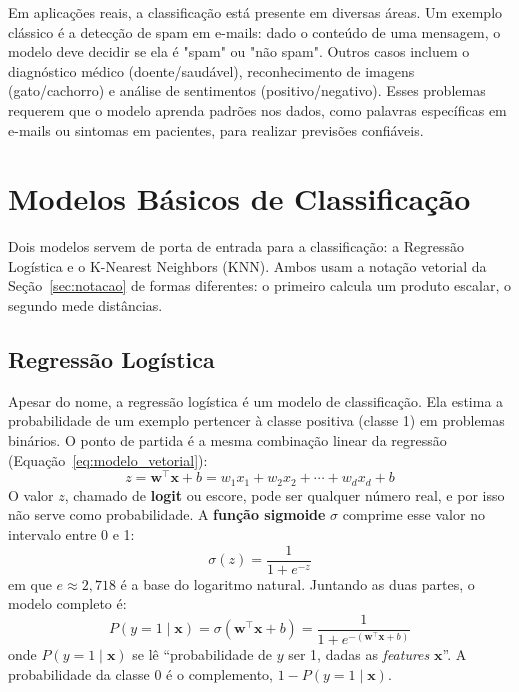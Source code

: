 \documentclass[a4paper,12pt,openany]{book}
\begin{document}
Em aplicações reais, a classificação está presente em diversas áreas. Um exemplo clássico é a detecção de spam em e-mails: dado o conteúdo de uma mensagem, o modelo deve decidir se ela é "spam" ou "não spam". Outros casos incluem o diagnóstico médico (doente/saudável), reconhecimento de imagens (gato/cachorro) e análise de sentimentos (positivo/negativo). Esses problemas requerem que o modelo aprenda padrões nos dados, como palavras específicas em e-mails ou sintomas em pacientes, para realizar previsões confiáveis.

\section{Modelos Básicos de Classificação}

Dois modelos servem de porta de entrada para a classificação: a Regressão Logística e o K-Nearest Neighbors (KNN). Ambos usam a notação vetorial da Seção~\ref{sec:notacao} de formas diferentes: o primeiro calcula um produto escalar, o segundo mede distâncias.

\subsection{Regressão Logística}

Apesar do nome, a regressão logística é um modelo de classificação. Ela estima a probabilidade de um exemplo pertencer à classe positiva (classe 1) em problemas binários. O ponto de partida é a mesma combinação linear da regressão (Equação~\ref{eq:modelo_vetorial}):
\begin{equation}
z = \mathbf{w}^\top \mathbf{x} + b = w_1 x_1 + w_2 x_2 + \cdots + w_d x_d + b
\end{equation}
O valor \(z\), chamado de \textbf{logit} ou escore, pode ser qualquer número real, e por isso não serve como probabilidade. A \textbf{função sigmoide} \(\sigma\) comprime esse valor no intervalo entre 0 e 1:
\begin{equation}
\sigma(z) = \frac{1}{1 + e^{-z}}
\end{equation}
em que \(e \approx 2,718\) é a base do logaritmo natural. Juntando as duas partes, o modelo completo é:
\begin{equation}\label{eq:logistica}
P(y = 1 \mid \mathbf{x}) = \sigma(\mathbf{w}^\top \mathbf{x} + b) = \frac{1}{1 + e^{-(\mathbf{w}^\top \mathbf{x} + b)}}
\end{equation}
onde \(P(y = 1 \mid \mathbf{x})\) se lê ``probabilidade de \(y\) ser 1, dadas as \textit{features} \(\mathbf{x}\)''. A probabilidade da classe 0 é o complemento, \(1 - P(y = 1 \mid \mathbf{x})\).
\end{document}
